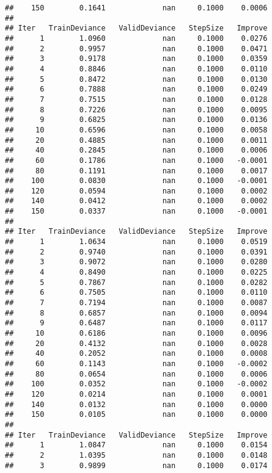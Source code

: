 \documentclass[]{article}
\begin{document}
\begin{verbatim}
##    150        0.1641             nan     0.1000    0.0006
## 
## Iter   TrainDeviance   ValidDeviance   StepSize   Improve
##      1        1.0960             nan     0.1000    0.0276
##      2        0.9957             nan     0.1000    0.0471
##      3        0.9178             nan     0.1000    0.0359
##      4        0.8846             nan     0.1000    0.0110
##      5        0.8472             nan     0.1000    0.0130
##      6        0.7888             nan     0.1000    0.0249
##      7        0.7515             nan     0.1000    0.0128
##      8        0.7226             nan     0.1000    0.0095
##      9        0.6825             nan     0.1000    0.0136
##     10        0.6596             nan     0.1000    0.0058
##     20        0.4885             nan     0.1000    0.0011
##     40        0.2845             nan     0.1000    0.0006
##     60        0.1786             nan     0.1000   -0.0001
##     80        0.1191             nan     0.1000    0.0017
##    100        0.0830             nan     0.1000   -0.0001
##    120        0.0594             nan     0.1000    0.0002
##    140        0.0412             nan     0.1000    0.0002
##    150        0.0337             nan     0.1000   -0.0001
## 
## Iter   TrainDeviance   ValidDeviance   StepSize   Improve
##      1        1.0634             nan     0.1000    0.0519
##      2        0.9740             nan     0.1000    0.0391
##      3        0.9072             nan     0.1000    0.0280
##      4        0.8490             nan     0.1000    0.0225
##      5        0.7867             nan     0.1000    0.0282
##      6        0.7505             nan     0.1000    0.0110
##      7        0.7194             nan     0.1000    0.0087
##      8        0.6857             nan     0.1000    0.0094
##      9        0.6487             nan     0.1000    0.0117
##     10        0.6186             nan     0.1000    0.0096
##     20        0.4132             nan     0.1000    0.0028
##     40        0.2052             nan     0.1000    0.0008
##     60        0.1143             nan     0.1000   -0.0002
##     80        0.0654             nan     0.1000    0.0006
##    100        0.0352             nan     0.1000   -0.0002
##    120        0.0214             nan     0.1000    0.0001
##    140        0.0132             nan     0.1000    0.0000
##    150        0.0105             nan     0.1000    0.0000
## 
## Iter   TrainDeviance   ValidDeviance   StepSize   Improve
##      1        1.0847             nan     0.1000    0.0154
##      2        1.0395             nan     0.1000    0.0148
##      3        0.9899             nan     0.1000    0.0174

\end{verbatim}
\end{document}

